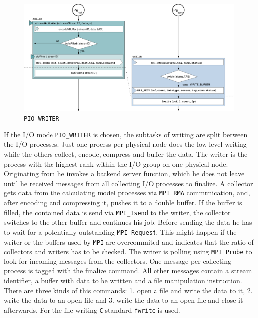 \begin{figure}[H]
\vspace{-10pt}
\centering
\includegraphics[scale=0.47]{../graphics/pio_writer.pdf}
\caption{{\tt PIO\_WRITER}}
\vspace{-10pt}
\end{figure}
If the I/O mode {\tt PIO\_WRITER} is chosen, the subtasks of writing are split
between the I/O processes. Just one process per physical node does the
low level writing  while the others collect, encode, compress and buffer 
the data. The writer is the process with the highest rank within the
I/O group on one physical node. Originating from {} 
he invokes a
backend server function, which he does not leave until he received messages from 
all  
collecting I/O processes to finalize.  A collector gets data from the calculating 
model processes via {\tt MPI RMA} communication, and, after encoding and
compressing it, pushes it to a double buffer. If the buffer is filled,
the contained data is send via \texttt{MPI\_Isend} to the writer, the 
collector
switches to the other buffer and continues his job. Before sending the
data he has to wait for a potentially outstanding
\texttt{MPI\_Request}. This might happen if the writer or the buffers
used by {\tt MPI} are overcommited and indicates that the ratio of
collectors and writers has to be checked. The writer is
polling using \texttt{MPI\_Probe} to look for incoming messages from
the collectors. One message per collecting process is tagged with the finalize 
command. All other messages contain a stream identifier, a buffer with
data to be written and a file manipulation instruction. There are three kinds of 
this commands:
1. open a file and write the data to it, 2. write the data to an
open file and 3. write the data to an open file and close it afterwards. 
For the file writing {\tt C} standard \texttt{fwrite} is used.

